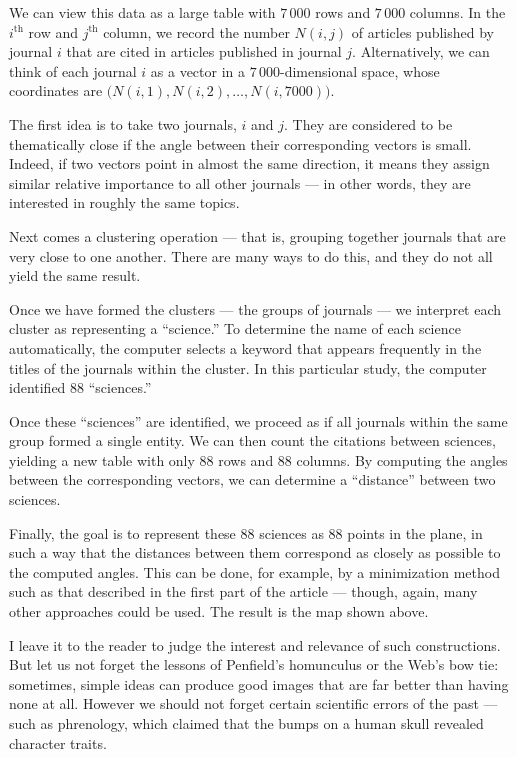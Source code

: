 \documentclass{amsart}
\begin{document}
We can view this data as a large table with $7\,000$ rows and $7\,000$
columns. In the $i^{\text{th}}$ row and $j^{\text{th}}$ column, we
record the number $N(i,j)$ of articles published by journal $i$ that
are cited in articles published in journal $j$. Alternatively, we can
think of each journal $i$ as a vector in a $7\,000$-dimensional space,
whose coordinates are $\big(N(i,1),N(i,2),\dots,N(i,7000)\big)$.

The first idea is to take two journals, $i$ and $j$. They are
considered to be thematically close if the angle between their
corresponding vectors is small. Indeed, if two vectors point in almost
the same direction, it means they assign similar relative importance
to all other journals --- in other words, they are interested in roughly the
same topics.

Next comes a clustering operation --- that is, grouping together
journals that are very close to one another. There are many ways to do
this, and they do not all yield the same result.

Once we have formed the clusters --- the groups of journals --- we
interpret each cluster as representing a ``science.'' To determine the
name of each science automatically, the computer selects a keyword
that appears frequently in the titles of the journals within the
cluster. In this particular study, the computer identified 88
``sciences.''

Once these ``sciences'' are identified, we proceed as if all
journals within the same group formed a single entity. We can then
count the citations between sciences, yielding a new table with only
88 rows and 88 columns. By computing the angles between the
corresponding vectors, we can determine a ``distance'' between two
sciences.

Finally, the goal is to represent these 88 sciences as 88 points in
the plane, in such a way that the distances between them correspond as
closely as possible to the computed angles. This can be done, for
example, by a minimization method such as that described in the first
part of the article --- though, again, many other approaches could be
used.  The result is the map shown above.%

I leave it to the reader to judge the interest and relevance of such
constructions. But let us not forget the lessons of Penfield’s
homunculus or the Web’s bow tie: sometimes, simple ideas can produce
good images that are far better than having none at all. However we
should not forget certain scientific errors of the past --- such as
phrenology, which claimed that the bumps on a human skull revealed
character traits.
\end{document}
